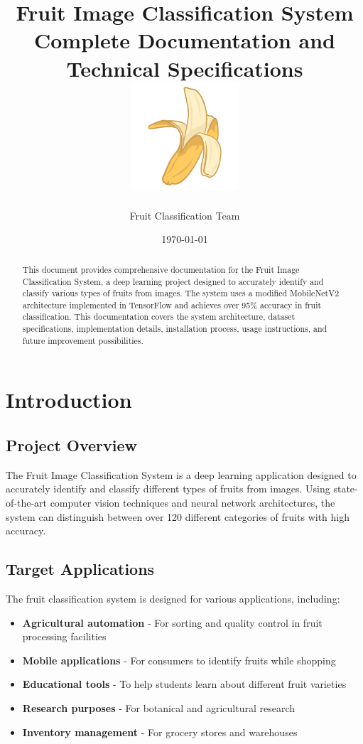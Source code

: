 \documentclass[11pt,a4paper]{report}
\title{
    \Huge{\textbf{Fruit Image Classification System}} \\
    \vspace{0.5cm}
    \large{Complete Documentation and Technical Specifications} \\
    \vspace{0.5cm}
    \includegraphics[width=0.3\textwidth]{logo.png}
}
\author{Fruit Classification Team}
\date{\today}
\begin{document}
\maketitle
\thispagestyle{empty}

\begin{abstract}
    This document provides comprehensive documentation for the Fruit Image Classification System, a deep learning project designed to accurately identify and classify various types of fruits from images. The system uses a modified MobileNetV2 architecture implemented in TensorFlow and achieves over 95\% accuracy in fruit classification. This documentation covers the system architecture, dataset specifications, implementation details, installation process, usage instructions, and future improvement possibilities.
\end{abstract}

\tableofcontents
\listoffigures
\listoftables

\chapter{Introduction}

\section{Project Overview}
The Fruit Image Classification System is a deep learning application designed to accurately identify and classify different types of fruits from images. Using state-of-the-art computer vision techniques and neural network architectures, the system can distinguish between over 120 different categories of fruits with high accuracy.

\section{Target Applications}
The fruit classification system is designed for various applications, including:

\begin{itemize}
    \item \textbf{Agricultural automation} - For sorting and quality control in fruit processing facilities
    \item \textbf{Mobile applications} - For consumers to identify fruits while shopping
    \item \textbf{Educational tools} - To help students learn about different fruit varieties
    \item \textbf{Research purposes} - For botanical and agricultural research
    \item \textbf{Inventory management} - For grocery stores and warehouses
\end{itemize}
\end{document}
